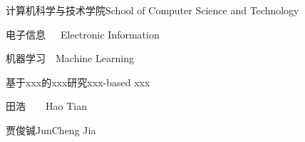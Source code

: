 
\school
{计算机科学与技术学院}{School of Computer Science and Technology}

\major
{电子信息~~~}{Electronic Information}

\direct
{机器学习~~}{Machine Learning}

\thesistitle
{基于xxx的xxx研究}{xxx-based xxx}  %

\thesisauthor
{田浩~~~~}{Hao Tian}

\teacher
{贾俊铖}{JunCheng Jia}






